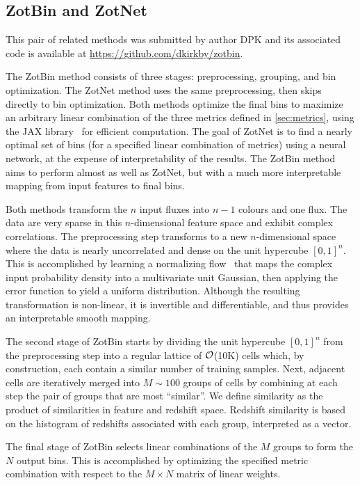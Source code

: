 \documentclass[twocolumn,twocolappendix]{aastex63}
\begin{document}
\subsection{ {\sc ZotBin and ZotNet} } \label{sec:zot}

This pair of related methods was submitted by author DPK and its associated code is available at
\url{https://github.com/dkirkby/zotbin}.

The ZotBin method consists of three stages: preprocessing, grouping, and bin optimization.  The ZotNet method
uses the same preprocessing, then skips directly to bin optimization.  Both methods optimize the final bins to
maximize an arbitrary linear combination of the three metrics defined in \ref{sec:metrics}, using the JAX
library~\cite{jax} for efficient computation. The goal of ZotNet is to find a nearly optimal set of bins (for
a specified linear combination of metrics) using a neural network, at the expense of interpretability of the
results.  The ZotBin method aims to perform almost as well as ZotNet, but with a much more interpretable mapping
from input features to final bins.

Both methods transform the $n$ input fluxes into $n-1$ colours and one flux. The data are very sparse in this
$n$-dimensional feature space and exhibit complex correlations. The preprocessing step transforms to a new
$n$-dimensional space where the data is nearly uncorrelated and dense on the unit hypercube $[0,1]^n$. This is accomplished
by learning a normalizing flow~\cite{2019arXiv191202762P} that maps the complex input probability density
into a multivariate unit Gaussian, then applying the error function to yield a uniform distribution. Although
the resulting transformation is non-linear, it is invertible and differentiable, and thus provides an interpretable
smooth mapping.

The second stage of ZotBin starts by dividing the unit hypercube $[0,1]^n$ from the preprocessing step
into a regular lattice of ${\cal O}$(10K) cells which, by construction, each contain a similar number
of training samples.  Next, adjacent cells are iteratively merged into $M \sim 100$ groups of cells by
combining at each step the pair of groups that are most ``similar''.  We define similarity as the product
of similarities in feature and redshift space.  Redshift similarity is based on the histogram of redshifts
associated with each group, interpreted as a vector.

The final stage of ZotBin selects linear combinations of the $M$ groups to form the $N$ output bins. This is
accomplished by optimizing the specified metric combination with respect to the $M\times N$ matrix of linear
weights.
\end{document}
